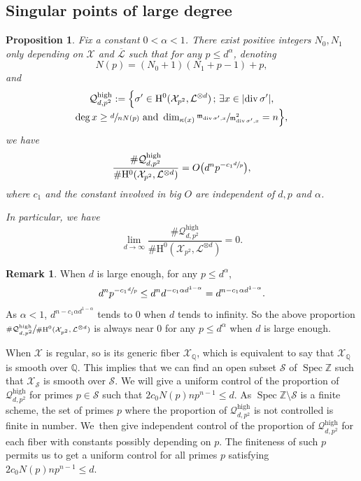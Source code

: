 \documentclass[11pt]{article}
\newcommand{\Subsection}{\subsection}
\numberwithin{equation}{section}
\newcommand{\sep}{\,;\,}
\theoremstyle{plain}
\newtheorem{prop}[thm]{Proposition}
\theoremstyle{definition}
\newtheorem*{rmq}{Remark}
\newcommand{\ho}{\mathrm{H}}
\newcommand{\m}{\mathfrak{m}}
\newcommand{\X}{\mathcal{X}}
\newcommand{\li}{\mathcal{L}}
\newcommand{\Q}{\mathbb{Q}}
\newcommand{\Z}{\mathbb{Z}}
\DeclareMathOperator{\Spec}{Spec}
\begin{document}
\Subsection{Singular points of large degree}\label{step3}

\begin{prop}\label{high}
Fix a constant $0<\alpha<1$.
There exist positive integers $N_0,N_1$ only depending on $\X$ and $\overline{\li}$ such that for any $p\leq d^{\alpha} $, denoting
\[
N(p)= (N_0+1)(N_1+p-1)+p,
\]
and
\begin{multline*}
\mathcal{Q}^{\mathrm{high}}_{d,p^2}:=\Bigl\{ \sigma'\in \ho^0(\X_{p^2}, \li^{\otimes d})\sep \exists x\in |{\div\sigma'}|,\\[-3pt]
\deg x\geq \sfrac{d}{nN(p)} \text{ and } \dim_{\kappa(x)}\sfrac{\m_{\div \sigma',x}}{\m^2_{\div \sigma', x}}=n \Bigr\},
\end{multline*}
we have
\[
\frac{\#\mathcal{Q}_{d,p^2}^{\mathrm{high}}}{\#\ho^0(\X_{p^2}, \li^{\otimes d})}=O\bigl(d^{n}p^{-c_1\sfrac{d}{p}} \bigr),
\]
where $c_1$ and the constant involved in big $O$ are independent of $d,p$ and $\alpha$.

In particular, we have
\[
\lim_{d\to \infty}\frac{\#\mathcal{Q}_{d,p^2}^{\mathrm{high}}}{\#\ho^0(\X_{p^2}, \li^{\otimes d})}=0.
\]
\end{prop}
\begin{rmq}
When $d$ is large enough, for any $p\leq d^{\alpha}$,
\[
d^{n}p^{-c_1\sfrac{d}{p}}\leq d^{n}d^{-c_1\alpha d^{1-\alpha}}=d^{n-c_1\alpha d^{1-\alpha}}.
\]
As $\alpha<1$, $d^{n-c_1\alpha d^{1-\alpha}}$ tends to $0$ when $d$ tends to infinity. So the above proportion $\sfrac{\#\mathcal{Q}_{d,p^2}^{\mathrm{high}}}{\#\ho^0(\X_{p^2}, \li^{\otimes d})}$ is always near $0$ for any $p\leq d^{\alpha}$ when $d$ is large enough.
\end{rmq}

When $\X$ is regular, so is its generic fiber $\X_{\Q}$, which is equivalent to say that $\X_{\Q}$ is smooth over $\Q$. This implies that we can find an open subset $\mathcal{S}$ of $\Spec \Z$ such that $\X_{\mathcal{S}}$ is smooth over $\mathcal{S}$. We will give a uniform control of the proportion of $\mathcal{Q}_{d,p^2}^{\mathrm{high}}$ for primes $p\in \mathcal{S}$ such that $2c_0N(p)np^{n-1}\leq d$. As $\Spec \Z\setminus\mathcal{S}$ is a finite scheme, the set of primes $p$ where the proportion of $\mathcal{Q}_{d,p^2}^{\mathrm{high}}$ is not controlled is finite in number. We~then give independent control of the proportion of $\mathcal{Q}_{d,p^2}^{\mathrm{high}}$ for each fiber with constants possibly depending on $p$. The finiteness of such $p$ permits us to get a uniform control for all primes $p$ satisfying $2c_0N(p)np^{n-1}\leq d$.
\end{document}
